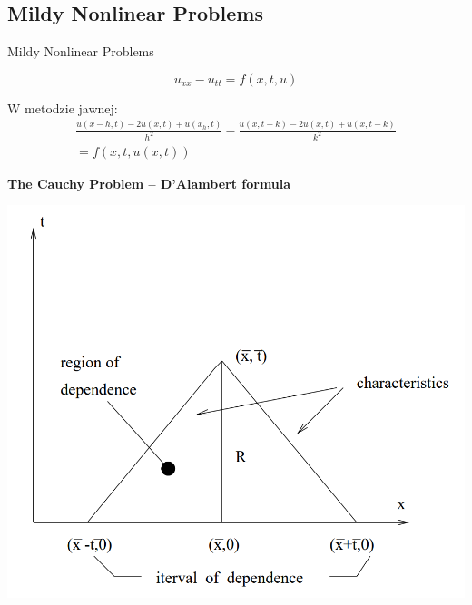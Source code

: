\subsection{Mildy Nonlinear Problems}
\begin{frame}{Mildy Nonlinear Problems}
\begin{block}{}
\begin{equation}u_{xx} - u_{tt} = f(x,t,u) \end{equation}
\end{block}
W metodzie jawnej: \\

\begin{equation} \begin{split} \frac{u(x-h,t) - 2 u(x,t) + u(x_h,t)}{h^2} - \frac{u(x,t+k) - 2u(x,t) + u(x,t-k)}{k^2} \\
= f(x,t,u(x,t)) \end{split} \end{equation}
\end{frame}

\begin{frame}
\textbf{The Cauchy Problem -- D'Alambert formula}
 \centerline{\includegraphics[height = 0.8 \textheight]{img/23/mildy_nonlinear}}
\vspace{5mm}

\end{frame}

